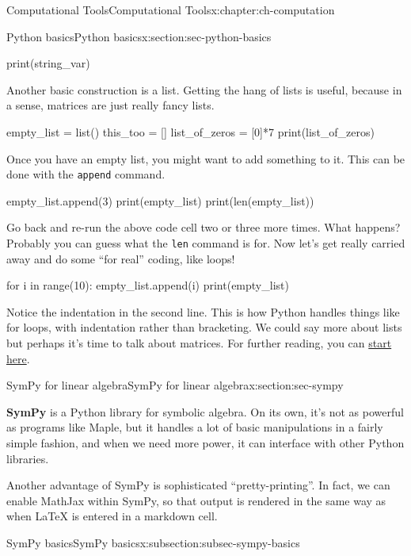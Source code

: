 \documentclass[oneside,10pt,]{book}
\newcommand{\mono}[1]{\texttt{#1}}
\newcommand{\terminology}[1]{\textbf{#1}}
\numberwithin{equation}{section}
\begin{document}
\begin{chapterptx}{Computational Tools}{}{Computational Tools}{}{}{x:chapter:ch-computation}
\begin{sectionptx}{Python basics}{}{Python basics}{}{}{x:section:sec-python-basics}
\begin{sageinput}
print(string_var)
\end{sageinput}
Another basic construction is a list. Getting the hang of lists is useful, because in a sense, matrices are just really fancy lists.%
\begin{sageinput}
empty_list = list()
this_too = []
list_of_zeros = [0]*7
print(list_of_zeros)
\end{sageinput}
Once you have an empty list, you might want to add something to it. This can be done with the \mono{append} command.%
\begin{sageinput}
empty_list.append(3)
print(empty_list)
print(len(empty_list))
\end{sageinput}
Go back and re-run the above code cell two or three more times. What happens? Probably you can guess what the \mono{len} command is for. Now let's get really carried away and do some ``for real'' coding, like loops!%
\begin{sageinput}
for i in range(10):
    empty_list.append(i)
print(empty_list)
\end{sageinput}
Notice the indentation in the second line. This is how Python handles things like for loops, with indentation rather than bracketing. We could say more about lists but perhaps it's time to talk about matrices. For further reading, you can \href{https://developers.google.com/edu/python/lists}{start here}.%
\end{sectionptx}
%
%
\typeout{************************************************}
\typeout{************************************************}
%
\begin{sectionptx}{SymPy for linear algebra}{}{SymPy for linear algebra}{}{}{x:section:sec-sympy}
\begin{introduction}{}%
\terminology{SymPy} is a Python library for symbolic algebra. On its own, it's not as powerful as programs like Maple, but it handles a lot of basic manipulations in a fairly simple fashion, and when we need more power, it can interface with other Python libraries.%
\par
Another advantage of SymPy is sophisticated ``pretty-printing''. In fact, we can enable MathJax within SymPy, so that output is rendered in the same way as when LaTeX is entered in a markdown cell.%
\end{introduction}%
%
%
\typeout{************************************************}
\typeout{************************************************}
%
\begin{subsectionptx}{SymPy basics}{}{SymPy basics}{}{}{x:subsection:subsec-sympy-basics}

\end{subsectionptx}
\end{sectionptx}
\end{chapterptx}
\end{document}

